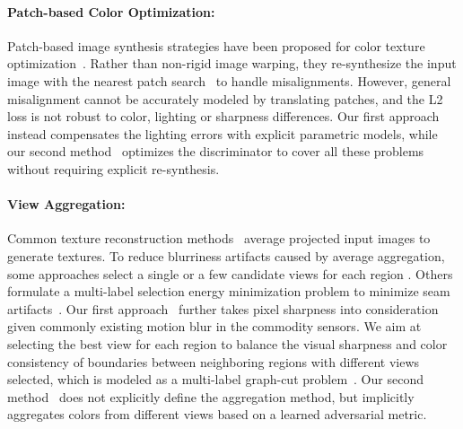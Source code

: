 \paragraph*{Patch-based Color Optimization:}
Patch-based image synthesis strategies have been proposed for color texture optimization~\cite{bi2017patch}. Rather than non-rigid image warping, they re-synthesize the input image with the nearest patch search~\cite{simakov2008summarizing} to handle misalignments. 
However, general misalignment cannot be accurately modeled by translating patches, and the L2 loss is not robust to color, lighting or sharpness differences. Our first approach~\cite{huang20173dlite} instead compensates the lighting errors with explicit parametric models, while our second method~\cite{huang2020adversarial} optimizes the discriminator to cover all these problems without requiring explicit re-synthesis.

\paragraph*{View Aggregation:} Common texture reconstruction methods~\cite{izadi2011kinectfusion,zhou2014color} average projected input images to generate textures.  
To reduce blurriness artifacts caused by average aggregation, some approaches select a single or a few candidate views for each region \cite{dessein2014seamless}. Others formulate a multi-label selection energy minimization problem to minimize seam artifacts~\cite{lempitsky2007seamless,sinha2008interactive,velho2007projective,waechter2014let}. Our first approach~\cite{huang20173dlite} further takes pixel sharpness into consideration given commonly existing motion blur in the commodity sensors. We aim at selecting the best view for each region to balance the visual sharpness and color consistency of boundaries between neighboring regions with different views selected, which is modeled as a multi-label graph-cut problem~\cite{boykov2001fast}. Our second method~\cite{huang2020adversarial} does not explicitly define the aggregation method, but implicitly aggregates colors from different views based on a learned adversarial metric.

